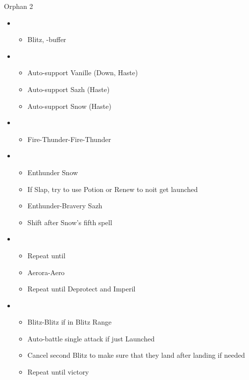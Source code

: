 \begin{battle}{Orphan 2}
\begin{itemize}
    \item \second
    \begin{itemize}
        \item Blitz, \syn-buffer
    \end{itemize}
    \item \fourth
    \begin{itemize}
        \item Auto-support Vanille (Down, Haste)
        \item Auto-support Sazh (Haste)
        \item Auto-support Snow (Haste)
    \end{itemize}
    \item \sixth
    \begin{itemize}
        \item Fire-Thunder-Fire-Thunder
    \end{itemize}
    \item \fourth
    \begin{itemize}
        \item Enthunder Snow
        \item If Slap, try to use Potion or Renew to noit get launched
        \item Enthunder-Bravery Sazh
        \item Shift after Snow's fifth spell
    \end{itemize}
    \item \fifth
    \begin{itemize}
        \item Repeat until \stagger
        \item Aerora-Aero
        \item Repeat until Deprotect and Imperil
    \end{itemize}
    \item \first
    \begin{itemize}
        \item Blitz-Blitz if in Blitz Range
        \item Auto-battle single attack if just Launched
        \item Cancel second Blitz to make sure that they land after landing if needed
        \item Repeat until victory
    \end{itemize}
\end{itemize}
\end{battle}